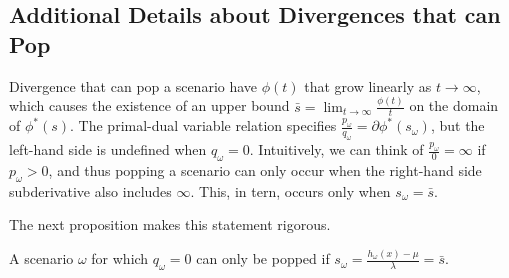 \documentclass[ijoc,nonblindrev]{informs3} %
\begin{document}
\subsection{Additional Details about Divergences that can Pop}
\label{ssec:pop}

Divergence that can pop a scenario have $\phi(t)$ that grow linearly as $t \rightarrow \infty$, which causes the existence of an upper bound $\bar{s} = \lim_{t \rightarrow \infty} \frac{\phi(t)}{t}$ on the domain of $\phi^*(s)$.
The primal-dual variable relation specifies $\frac{p_\omega}{q_\omega} = \partial \phi^*(s_\omega)$, but the left-hand side is undefined when $q_\omega = 0$.
Intuitively, we can think of $\frac{p_\omega}{0} = \infty$ if $p_\omega > 0$, and thus popping a scenario can only occur when the right-hand side subderivative also includes $\infty$.
This, in tern, occurs only when $s_\omega = \bar{s}$.

The next proposition makes this statement rigorous.

\begin{proposition} \label{prop:pop}
	A scenario $\omega$ for which $q_\omega = 0$ can only be popped if $s_\omega = \frac{h_\omega(x) - \mu}{\lambda} = \bar{s}$.
\end{proposition}
\end{document}
